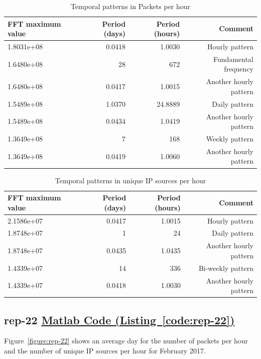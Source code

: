 \documentclass{article}
\newcommand{\codelink}[1]{%
    \hyperref[#1]{\quad\faArrowCircleRight\enskip Matlab Code (Listing~\ref{#1})}%
}
\begin{document}
\begin{table}[H]
    \centering
    \begin{tabular}{l|r|r|r}
        FFT maximum value & Period (days) & Period (hours) & Comment \\
        \hline
        1.8031e+08 & 0.0418 & 1.0030 & Hourly pattern \\
        1.6480e+08 & 28 & 672 & Fundamental frequency \\
        1.6480e+08 & 0.0417 & 1.0015 & Another hourly pattern \\
        1.5489e+08 & 1.0370 & 24.8889 & Daily pattern \\
        1.5489e+08 & 0.0434 & 1.0419 & Another hourly pattern \\
        1.3649e+08 & 7 & 168 & Weekly pattern \\
        1.3649e+08 & 0.0419 & 1.0060 &  Another hourly pattern \\
    \end{tabular}
    \caption{\label{table:rep-21-fft-packets} Temporal patterns in Packets per hour}
\end{table}

\begin{table}[H]
    \centering
    \begin{tabular}{l|r|r|r}
        FFT maximum value & Period (days) & Period (hours) & Comment \\
        \hline
        2.1586e+07 & 0.0417 & 1.0015 & Hourly pattern \\
        1.8748e+07 & 1 & 24 & Daily pattern \\
        1.8748e+07 & 0.0435 &  1.0435 & Another hourly pattern \\
        1.4339e+07 & 14 &  336 & Bi-weekly pattern \\
        1.4339e+07 & 0.0418&  1.0030 & Another hourly pattern \\
    \end{tabular}
    \caption{\label{table:rep-21-fft-ips} Temporal patterns in unique IP sources per hour}
\end{table}

\subsection{rep-22 \codelink{code:rep-22}}

Figure~\ref{figure:rep-22} shows an average day for the number of packets per hour and the number of
unique IP sources per hour for February 2017.
\end{document}
